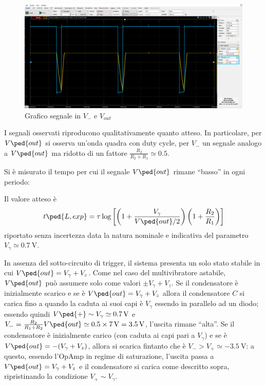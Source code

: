\documentclass[10pt, a4paper, italian]{article}
\begin{document}
\begin{figure}[htbp]
\centering
\includegraphics[scale=0.42]{monostabileV-}
\caption{Grafico segnale in $V_-$ e $V_{out}$ \label{fig: monostabileV-}}
\end{figure}

I segnali osservati riproducono qualitativamente quanto atteso.
In particolare, per $ V \ped{out} $ si osserva un'onda quadra con duty cycle,
per $ V_{-} $ un segnale analogo a $ V\ped{out} $ ma ridotto di un fattore
$\frac{R_2}{R_2 + R_1} \simeq 0.5 $.

Si è misurato il tempo per cui il segnale $ V \ped{out} $ rimane ``basso'' in ogni periodo:

Il valore atteso è
\begin{equation} \label{eq: mstabile}
t\ped{L, exp} =
\tau \log\left[\left(1 + \frac{V_\gamma}{V \ped{out}/2}\right)
\left(1 + \frac{R_2}{R_1}\right)\right]
\end{equation}
riportato senza incertezza data la natura nominale e indicativa del parametro $ V_{\gamma} \simeq \SI{0.7}{\volt} $.

In assenza del sotto-circuito di trigger, il sistema presenta un solo stato stabile in cui $ V\ped{out} =  V_{\gamma} + V_{z} $.
Come nel caso del multivibratore astabile, $ V\ped{out} $ può assumere solo come valori $ \pm V_{\gamma} + V_{z} $.
Se il condensatore è inizialmente scarico e se è $ V\ped{out} = V_{\gamma} + V_{z} $ allora il condensatore $ C $ si carica fino a quando la caduta ai suoi capi è $ V_{\gamma} $ essendo in parallelo ad un diodo; essendo quindi $ V\ped{+} \sim V_{\gamma} \simeq \SI{0.7}{\volt} $ e $ V_{-} = \frac{R_{2}}{R_{1} + R_{2}} V\ped{out} \simeq 0.5 \times \SI{7}{\volt} = \SI{3.5}{\volt} $, l'uscita rimane ``alta''.
Se il condensatore è inizialmente carico (con caduta ai capi pari a $ V_{\gamma} $) e se è $ V\ped{out} = -(V_{\gamma} + V_{z}) $, allora si scarica fintanto che è $ V_{-} > V_{+} \simeq -\SI{3.5}{\volt} $: a questo, essendo l'OpAmp in regime di saturazione, l'uscita passa a $ V\ped{out} = V_{\gamma} + V_{z} $ e il condensatore si carica come descritto sopra, ripristinando la condizione $ V_{+} \sim V_{\gamma} $. \\
\end{document}
